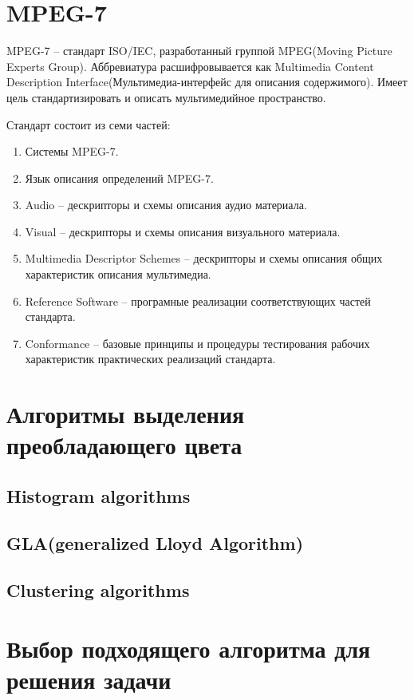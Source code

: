 \section{ MPEG-7}
MPEG-7 -- стандарт ISO/IEC, разработанный группой MPEG(Moving Picture Experts Group). Аббревиатура расшифровывается как Multimedia Content Description Interface(Мультимедиа-интерфейс для описания содержимого). Имеет цель стандартизировать и описать мультимедийное пространство.

Стандарт состоит из семи частей:
\begin{enumerate}
	\item Системы MPEG-7.
	\item Язык описания определений MPEG-7.
	\item Audio -- дескрипторы и схемы описания аудио материала.
	\item Visual -- дескрипторы и схемы описания визуального материала.
	\item Multimedia Descriptor Schemes -- дескрипторы и схемы описания общих характеристик описания мультимедиа.
	\item Reference Software -- програмные реализации соответствующих частей стандарта.
	\item Conformance -- базовые принципы и процедуры тестирования рабочих характеристик практических реализаций стандарта.
\end{enumerate}

\section{ Алгоритмы выделения преобладающего цвета}
\subsection{ Histogram algorithms}
\subsection{ GLA(generalized Lloyd Algorithm)}
\subsection{ Clustering algorithms}

\section{ Выбор подходящего алгоритма для решения задачи}
